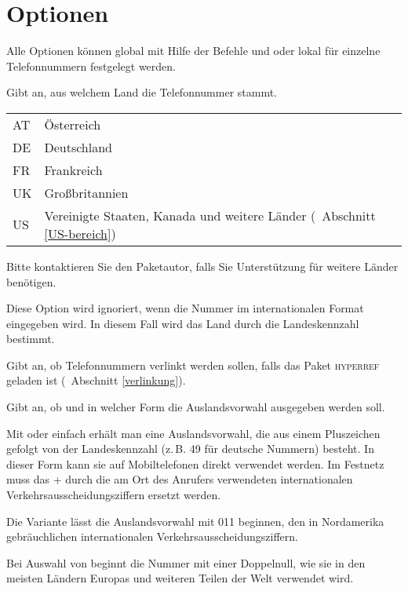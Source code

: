 \documentclass[numbers=noenddot]{scrreprt}
\newcommand*\Paket[1]{\textsc{#1}}
\newcommand*\UeberschriftOptionen[1]{\section{Optionen}\label{optionen-#1}}
\newcommand*\vglAbschnitt[1]{(\cf\ Abschnitt \ref{#1})}
\begin{document}
\UeberschriftOptionen{allgemein}
Alle Optionen können global mit Hilfe der Befehle  und  oder lokal für einzelne Telefonnummern festgelegt werden.
\begin{Befehlsliste}
Gibt an, aus welchem Land die Telefonnummer stammt.
\begin{center}
\begin{tabular}{>{\ttfamily}ll}
AT & Österreich \\
DE & Deutschland \\
FR & Frankreich \\
UK & Großbritannien \\
US & Vereinigte Staaten, Kanada und weitere Länder
\vglAbschnitt{US-bereich}
\end{tabular}
\end{center}
Bitte kontaktieren Sie den Paketautor, falls Sie Unterstützung für weitere Länder benötigen.

Diese Option wird ignoriert, wenn die Nummer im internationalen Format eingegeben wird. In diesem Fall wird das Land durch die Landeskennzahl bestimmt.

Gibt an, ob Telefonnummern verlinkt werden sollen, falls das Paket \Paket{hyperref} geladen ist
\vglAbschnitt{verlinkung}.

Gibt an, ob und in welcher Form die Auslandsvorwahl ausgegeben werden soll.

Mit  oder einfach  erhält man eine Auslandsvorwahl, die aus einem Pluszeichen gefolgt von der Landeskennzahl (z.\,B. 49 für deutsche Nummern) besteht. In dieser Form kann sie auf Mobiltelefonen direkt verwendet werden. Im Festnetz muss das + durch die am Ort des Anrufers verwendeten internationalen Verkehrsausscheidungsziffern ersetzt werden.
\begin{sidebyside}
\end{sidebyside}
Die Variante  lässt die Auslandsvorwahl mit 011 beginnen, den in Nordamerika gebräuchlichen internationalen Verkehrsausscheidungsziffern.
\begin{sidebyside}
\end{sidebyside}
Bei Auswahl von  beginnt die Nummer mit einer Doppelnull, wie sie in den meisten Ländern Europas und weiteren Teilen der Welt verwendet wird.
\begin{sidebyside}
\end{sidebyside}


\end{Befehlsliste}
\end{document}
